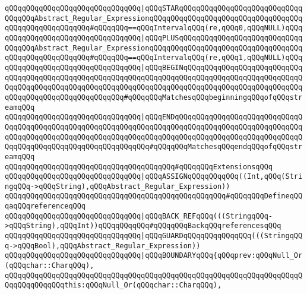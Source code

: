 \verb|qQQqqQQqqQQqqQQqqQQqqQQqqQQqqQQq|\verb#|qQQqSTARqQQqqQQqqQQqqQQqqQQqqQQqqQQqqQQqqQQqAbstract_Regular_ExpressionqQQqqQQqqQQqqQQqqQQqqQQqqQQqqQQqqQQqqQQqqQQqqQQqqQQqqQQq#\verb|#qQQqqQQq==qQQqIntervalqQQq(re,qQQq0,qQQqNULL)qQQq|\newline
\verb|qQQqqQQqqQQqqQQqqQQqqQQqqQQqqQQq|\verb#|qQQqPLUSqQQqqQQqqQQqqQQqqQQqqQQqqQQqqQQqqQQqAbstract_Regular_ExpressionqQQqqQQqqQQqqQQqqQQqqQQqqQQqqQQqqQQqqQQqqQQqqQQqqQQqqQQq#\verb|#qQQqqQQq==qQQqIntervalqQQq(re,qQQq1,qQQqNULL)qQQq|\newline
\verb|qQQqqQQqqQQqqQQqqQQqqQQqqQQqqQQq|\verb#|qQQqBEGINqQQqqQQqqQQqqQQqqQQqqQQqqQQqqQQqqQQqqQQqqQQqqQQqqQQqqQQqqQQqqQQqqQQqqQQqqQQqqQQqqQQqqQQqqQQqqQQqqQQqqQQqqQQqqQQqqQQqqQQqqQQqqQQqqQQqqQQqqQQqqQQqqQQqqQQqqQQqqQQqqQQqqQQqqQQqqQQqqQQqqQQqqQQqqQQqqQQq#\verb|#qQQqqQQqMatchesqQQqbeginningqQQqofqQQqstreamqQQq|\newline
\verb|qQQqqQQqqQQqqQQqqQQqqQQqqQQqqQQq|\verb#|qQQqENDqQQqqQQqqQQqqQQqqQQqqQQqqQQqqQQqqQQqqQQqqQQqqQQqqQQqqQQqqQQqqQQqqQQqqQQqqQQqqQQqqQQqqQQqqQQqqQQqqQQqqQQqqQQqqQQqqQQqqQQqqQQqqQQqqQQqqQQqqQQqqQQqqQQqqQQqqQQqqQQqqQQqqQQqqQQqqQQqqQQqqQQqqQQqqQQqqQQqqQQqqQQq#\verb|#qQQqqQQqMatchesqQQqendqQQqofqQQqstreamqQQq|\newline
\newline
\verb|qQQqqQQqqQQqqQQqqQQqqQQqqQQqqQQqqQQqqQQq#qQQqqQQqExtensionsqQQq|\newline
\newline
\verb|qQQqqQQqqQQqqQQqqQQqqQQqqQQqqQQq|\verb#|qQQqASSIGNqQQqqQQqqQQq((Int,qQQq(StringqQQq->qQQqString),qQQqAbstract_Regular_Expression))#\newline
\newline
\verb|qQQqqQQqqQQqqQQqqQQqqQQqqQQqqQQqqQQqqQQqqQQqqQQqqQQq#qQQqqQQqDefineqQQqaqQQqreferenceqQQq|\newline
\newline
\verb|qQQqqQQqqQQqqQQqqQQqqQQqqQQqqQQq|\verb#|qQQqBACK_REFqQQq(((StringqQQq->qQQqString),qQQqInt))qQQqqQQqqQQq#\verb|#qQQqqQQqBackqQQqreferencesqQQq|\newline
\newline
\verb|qQQqqQQqqQQqqQQqqQQqqQQqqQQqqQQq|\verb#|qQQqGUARDqQQqqQQqqQQqqQQq(((StringqQQq->qQQqBool),qQQqAbstract_Regular_Expression))#\newline
\newline
\verb|qQQqqQQqqQQqqQQqqQQqqQQqqQQqqQQq|\verb#|qQQqBOUNDARYqQQq{qQQqprev:qQQqNull_Or(qQQqchar::CharqQQq),#\newline
\verb|qQQqqQQqqQQqqQQqqQQqqQQqqQQqqQQqqQQqqQQqqQQqqQQqqQQqqQQqqQQqqQQqqQQqqQQqqQQqqQQqqQQqthis:qQQqNull_Or(qQQqchar::CharqQQq),|\newline
